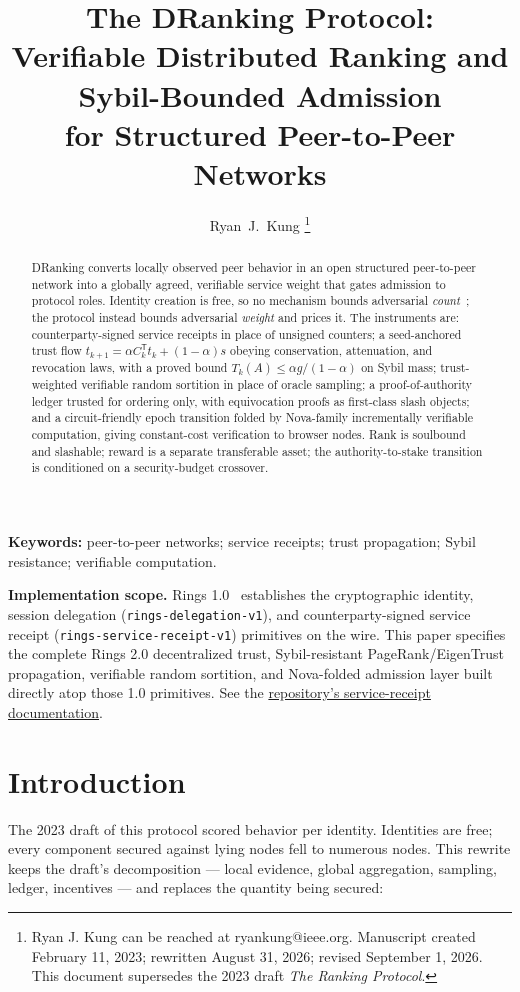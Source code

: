 \documentclass[11pt,letterpaper]{article}
\author{Ryan~J.~Kung%
\thanks{Ryan J. Kung can be reached at ryankung@ieee.org.
Manuscript created February 11, 2023; rewritten August 31, 2026;
revised September 1, 2026.
This document supersedes the 2023 draft \emph{The Ranking Protocol}.}}
\title{The DRanking Protocol:\\[0.3em]
\large Verifiable Distributed Ranking and Sybil-Bounded Admission\\
for Structured Peer-to-Peer Networks}
\date{}
\begin{document}
\maketitle

\begin{abstract}
DRanking converts locally observed peer behavior in an open structured
peer-to-peer network into a globally agreed, verifiable service weight that
gates admission to protocol roles.  Identity creation is free, so no
mechanism bounds adversarial \emph{count}~\cite{Douceur2002}; the protocol
instead bounds adversarial \emph{weight} and prices it.  The instruments
are: counterparty-signed service receipts in place of unsigned counters; a
seed-anchored trust flow
$t_{k+1}=\alpha C_k^{\mathsf T}t_k+(1-\alpha)s$
obeying conservation, attenuation, and revocation laws, with a proved bound
$T_k(A)\le\alpha g/(1-\alpha)$ on Sybil mass; trust-weighted verifiable
random sortition in place of oracle sampling; a proof-of-authority ledger
trusted for ordering only, with equivocation proofs as first-class slash
objects; and a circuit-friendly epoch transition folded by Nova-family
incrementally verifiable computation, giving constant-cost verification to
browser nodes.  Rank is soulbound and slashable; reward is a separate
transferable asset; the authority-to-stake transition is conditioned on a
security-budget crossover.
\end{abstract}

\noindent\textbf{Keywords:} peer-to-peer networks; service receipts; trust propagation;
Sybil resistance; verifiable computation.

\medskip
\noindent\textbf{Implementation scope.} Rings 1.0~\cite{RingsWhitepaper2026}
establishes the cryptographic identity, session delegation
(\texttt{rings-delegation-v1}), and counterparty-signed service receipt
(\texttt{rings-service-receipt-v1}) primitives on the wire.  This paper
specifies the complete Rings 2.0 decentralized trust, Sybil-resistant
PageRank/EigenTrust propagation, verifiable random sortition, and Nova-folded
admission layer built directly atop those 1.0 primitives.  See the
\href{https://github.com/RingsNetwork/rings/blob/master/docs/src/advanced-topic/dranking-service-receipts.md}{repository's service-receipt documentation}.

\section{Introduction}

The 2023 draft of this protocol scored behavior per identity.  Identities
are free; every component secured against lying nodes fell to numerous
nodes.  This rewrite keeps the draft's decomposition --- local evidence,
global aggregation, sampling, ledger, incentives --- and replaces the
quantity being secured:
\end{document}
